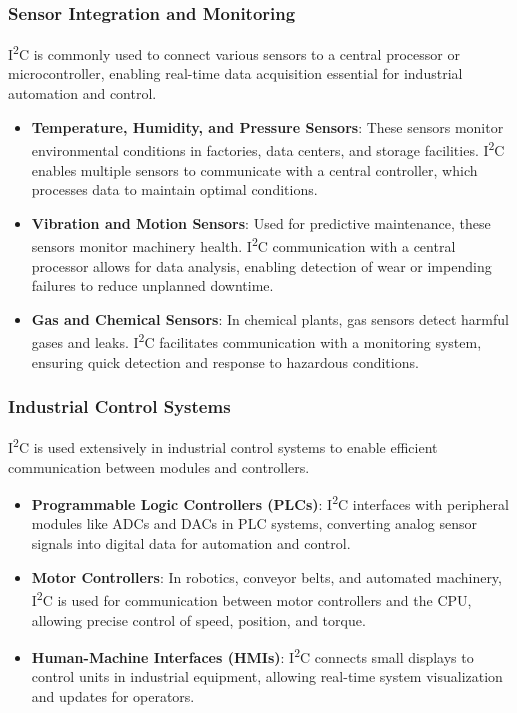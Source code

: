 \documentclass[a4paper,12pt]{report}
\begin{document}
\subsubsection*{Sensor Integration and Monitoring}
I\textsuperscript{2}C is commonly used to connect various sensors to a central processor or microcontroller, enabling real-time data acquisition essential for industrial automation and control.
\begin{itemize}
    \item \textbf{Temperature, Humidity, and Pressure Sensors}: These sensors monitor environmental conditions in factories, data centers, and storage facilities. I\textsuperscript{2}C enables multiple sensors to communicate with a central controller, which processes data to maintain optimal conditions.
    \item \textbf{Vibration and Motion Sensors}: Used for predictive maintenance, these sensors monitor machinery health. I\textsuperscript{2}C communication with a central processor allows for data analysis, enabling detection of wear or impending failures to reduce unplanned downtime.
    \item \textbf{Gas and Chemical Sensors}: In chemical plants, gas sensors detect harmful gases and leaks. I\textsuperscript{2}C facilitates communication with a monitoring system, ensuring quick detection and response to hazardous conditions.
\end{itemize}

\subsubsection*{Industrial Control Systems}
I\textsuperscript{2}C is used extensively in industrial control systems to enable efficient communication between modules and controllers.
\begin{itemize}
    \item \textbf{Programmable Logic Controllers (PLCs)}: I\textsuperscript{2}C interfaces with peripheral modules like ADCs and DACs in PLC systems, converting analog sensor signals into digital data for automation and control.
    \item \textbf{Motor Controllers}: In robotics, conveyor belts, and automated machinery, I\textsuperscript{2}C is used for communication between motor controllers and the CPU, allowing precise control of speed, position, and torque.
    \item \textbf{Human-Machine Interfaces (HMIs)}: I\textsuperscript{2}C connects small displays to control units in industrial equipment, allowing real-time system visualization and updates for operators.
\end{itemize}
\end{document}
